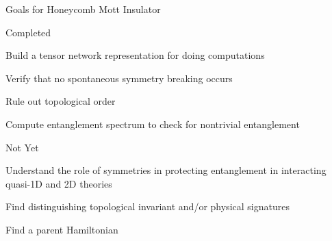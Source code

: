 \begin{frame}{Goals for Honeycomb Mott Insulator}
\vskip-1.5cm
\begin{block}{Completed}
\bi 
\item Build a tensor network representation for doing computations
\item  Verify that no spontaneous symmetry breaking occurs

\item Rule out topological order

\item Compute entanglement spectrum to check for nontrivial entanglement

\ei 
\end{block}
\begin{block}{Not Yet}
\bi
\item Understand the role of symmetries in protecting entanglement in interacting quasi-1D and 2D theories
\item Find distinguishing topological invariant and/or physical signatures
\item Find a parent Hamiltonian 
\ei
\end{block}
\end{frame}